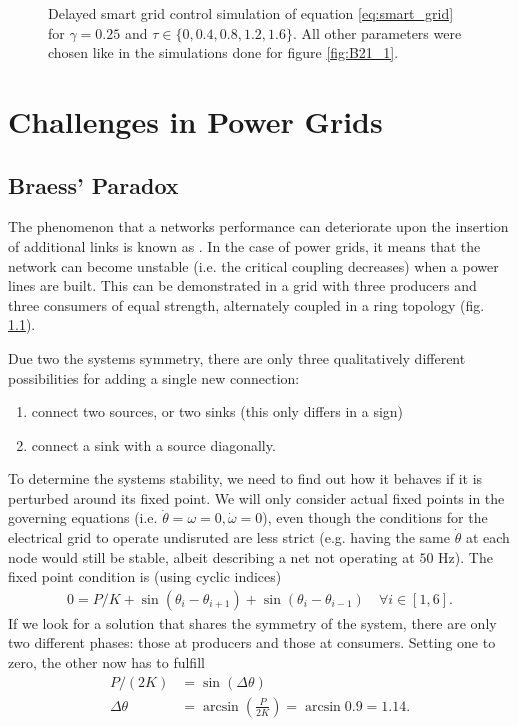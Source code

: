 \documentclass{scrartcl}
\begin{document}
\begin{figure}[h]
    \centering
    \caption{Delayed smart grid control simulation of equation
        \eqref{eq:smart_grid} for $\gamma = 0.25$ and $\tau\in \{0, 0.4,
        0.8, 1.2, 1.6\}$. All other parameters were chosen like in the
        simulations done for figure \ref{fig:B21_1}.}
    \label{fig:B23}
\end{figure}

\clearpage

\section{Challenges in Power Grids}
\subsection{Braess' Paradox}
The phenomenon that a networks performance can deteriorate upon the insertion of additional links is known as . In the case of power grids, it means that the network can become unstable (i.e. the critical coupling decreases) when a power lines are built. This can be demonstrated in a grid with three producers and three consumers of equal strength, alternately coupled in a ring topology (fig. \ref{}). 

Due two the systems symmetry, there are only three qualitatively different possibilities for adding a single new connection:
\begin{enumerate}
 \item connect two sources, or two sinks (this only differs in a sign)
 \item connect a sink with a source diagonally.
\end{enumerate}

To determine the systems stability, we need to find out how it behaves if it is perturbed around its fixed point. We will only consider actual fixed points in the governing equations (i.e. $\dot{\theta} = \omega = 0, \dot{\omega} = 0$), even though the conditions for the electrical grid to operate undisruted are less strict (e.g. having the same $\dot{\theta}$ at each node would still be stable, albeit describing a net not operating at $50$ Hz).
The fixed point condition is (using cyclic indices)
\begin{align}
 0 = P/K + \sin \left(\theta_i - \theta_{i+1} \right) + \sin \left(\theta_i - \theta_{i-1} \right) \quad \forall i \in \left[ 1, 6\right].
\end{align}
If we look for a solution that shares the symmetry of the system, there are only two different phases: those at producers and those at consumers. Setting one to zero, the other now has to fulfill
\begin{align}
P/(2K) &= \sin \left( \Delta \theta \right)\\
\Delta \theta &= \arcsin \left( \frac{P}{2K}\right) = \arcsin{0.9} = 1.14.
\end{align}
 
\end{document}
